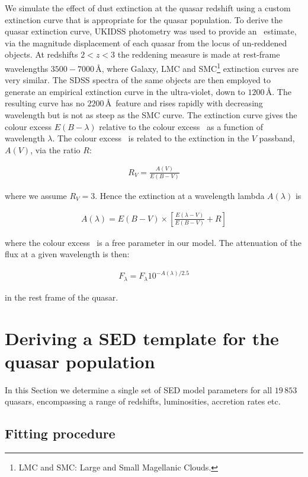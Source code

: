 We simulate the effect of dust extinction at the quasar redshift using a custom extinction curve that is appropriate for the quasar population. 
To derive the quasar extinction curve, UKIDSS photometry was used to provide an \ebv\, estimate, via the magnitude displacement of each quasar from the locus of un-reddened objects. 
At redshifts $2 < z < 3$ the reddening measure is made at rest-frame wavelengths $3500-7000$\,\AA, where Galaxy, LMC and SMC\footnote{LMC and SMC: Large and Small Magellanic Clouds.} extinction curves are very similar. 
The SDSS spectra of the same objects are then employed to generate an empirical extinction curve in the ultra-violet, down to $1200$\,\AA. 
The resulting curve has no $2200$\,\AA\, feature and rises rapidly with decreasing wavelength but is not as steep as the SMC curve. 
The extinction curve gives the colour excess $E(B-\lambda)$ relative to the colour excess \ebv\, as a function of wavelength $\lambda$. 
The colour excess \ebv\, is related to the extinction in the $V$ passband, $A(V)$, via the ratio $R$: 

\begin{eqnarray}
  R_V = \frac{A(V)}{E(B-V)}
\end{eqnarray}

where we assume $R_V = 3$. 
Hence the extinction at a wavelength lambda $A(\lambda)$ is 

\begin{eqnarray}
  A(\lambda) = E(B-V) \times \left[ \frac{E(\lambda-V)}{E(B-V)} + R \right] 
\end{eqnarray}

where the colour excess \ebv\, is a free parameter in our model. 
The attenuation of the flux at a given wavelength is then:

\begin{eqnarray}
  F_\lambda = F_\lambda10^{-A(\lambda)/2.5}
\end{eqnarray}

in the rest frame of the quasar. 

\section{Deriving a SED template for the quasar population} 
\label{sec:ch5-standardmodel}

In this Section we determine a single set of SED model parameters for all $19\,853$ quasars, encompassing a range of redshifts, luminosities, accretion rates etc. 

\subsection{Fitting procedure}

